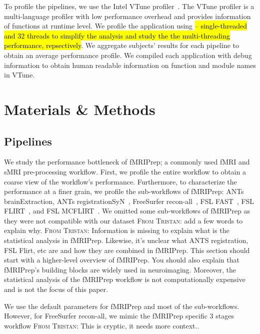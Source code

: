 \documentclass[conference]{IEEEtran}
\newcommand{\TG}[1]{\color{blue}\textsc{From Tristan: }#1\color{black}}
\newcommand{\HL}[1]{\hl{#1}}
\begin{document}

To profile the pipelines, we use the Intel VTune profiler~\cite{vtune-profiler}. The VTune profiler is a multi-language profiler with low performance overhead and provides information of functions at runtime level. We profile the application using \HL{-- single-threaded and 32 threads to simplify the analysis and study the the multi-threading performance, repsectively}. We aggregate subjects' results for each pipeline to obtain an average performance profile. We compiled each application with debug information to obtain human readable information on function and module names in VTune.

\section{Materials \& Methods}
\subsection{Pipelines}
We study the performance bottleneck of fMRIPrep; a commonly used fMRI and sMRI pre-processing workflow. First, we profile the entire workflow to obtain a coarse view of the workflow's performance. Furthermore, to characterize the performance at a finer grain, we profile the sub-workflows of fMRIPrep: ANTs brainExtraction, ANTs registrationSyN~\cite{Avants2008-ea}, FreeSurfer recon-all~\cite{Dale1999-wu}, FSL FAST~\cite{Zhang2001-hx}, FSL FLIRT~\cite{Jenkinson2002-od,Jenkinson2001-eu,Greve2009-dw}, and FSL MCFLIRT~\cite{Jenkinson2002-od}. We omitted some sub-workflows of fMRIPrep as they were not compatible with our dataset \TG{add a few words to explain why}. \TG{Information is missing to explain what is the statistical analysis in fMRIPrep. Likewise, it's unclear what ANTS registration, FSL Flirt, etc are and how they are combined in fMRIPrep. This section should start with a higher-level overview of fMRIPrep. You should also explain that fMRIPrep's building blocks are widely used in neuroimaging.} Moreover, the statistical analysis of the fMRIPrep workflow is not computationally expensive and is not the focus of this paper.

We use the default parameters for fMRIPrep and most of the sub-workflows. However, for FreeSurfer recon-all, we mimic the fMRIPrep specific 3 stages workflow \TG{This is cryptic, it needs more context.}.
\end{document}
